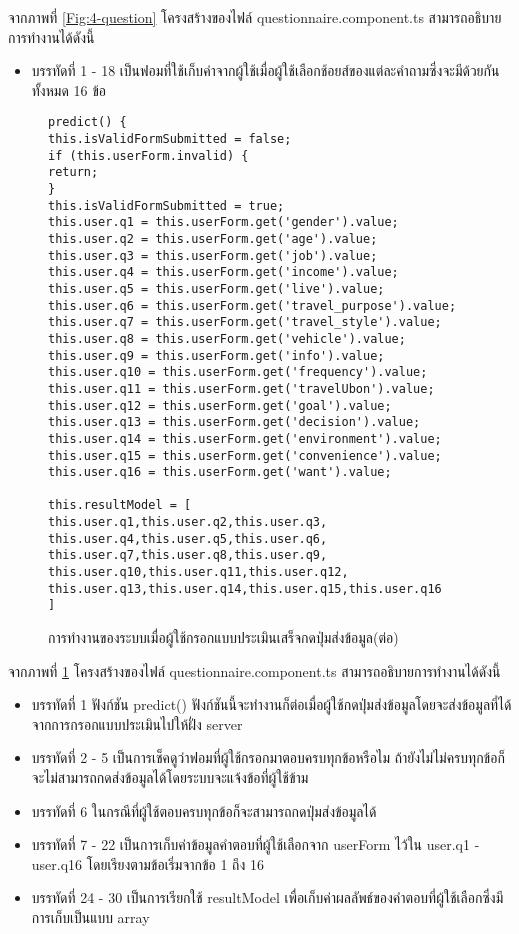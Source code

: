 จากภาพที่ \ref{Fig:4-question} โครงสร้างของไฟล์ questionnaire.component.ts สามารถอธิบายการทำงานได้ดังนี้
\begin{itemize}[label={--}]
\item บรรทัดที่ 1 - 18 เป็นฟอมที่ใช้เก็บค่าจากผู้ใช้เมื่อผู้ใช้เลือกช้อยส์ของแต่ละคำถามซึ่งจะมีด้วยกันทั้งหมด 16 ข้อ
\end{itemize}
\newpage

\begin{figure}[H]
{\begin{lstlisting}
predict() {
this.isValidFormSubmitted = false;
if (this.userForm.invalid) {
return;
}
this.isValidFormSubmitted = true;
this.user.q1 = this.userForm.get('gender').value;
this.user.q2 = this.userForm.get('age').value;
this.user.q3 = this.userForm.get('job').value;
this.user.q4 = this.userForm.get('income').value;
this.user.q5 = this.userForm.get('live').value;
this.user.q6 = this.userForm.get('travel_purpose').value;
this.user.q7 = this.userForm.get('travel_style').value;
this.user.q8 = this.userForm.get('vehicle').value;
this.user.q9 = this.userForm.get('info').value;
this.user.q10 = this.userForm.get('frequency').value;
this.user.q11 = this.userForm.get('travelUbon').value;
this.user.q12 = this.userForm.get('goal').value;
this.user.q13 = this.userForm.get('decision').value;
this.user.q14 = this.userForm.get('environment').value;
this.user.q15 = this.userForm.get('convenience').value;
this.user.q16 = this.userForm.get('want').value;

this.resultModel = [
this.user.q1,this.user.q2,this.user.q3,
this.user.q4,this.user.q5,this.user.q6,
this.user.q7,this.user.q8,this.user.q9,
this.user.q10,this.user.q11,this.user.q12,
this.user.q13,this.user.q14,this.user.q15,this.user.q16
]
\end{lstlisting}}
\caption{การทำงานของระบบเมื่อผู้ใช้กรอกแบบประเมินเสร็จกดปุ่มส่งข้อมูล(ต่อ)}
\label{Fig:4-question1}
\end{figure}
\newpage

จากภาพที่ \ref{Fig:4-question1} โครงสร้างของไฟล์ questionnaire.component.ts สามารถอธิบายการทำงานได้ดังนี้
\begin{itemize}[label={--}]
\item บรรทัดที่ 1 ฟังก์ชัน predict() ฟังก์ชันนี้จะทำงานก็ต่อเมื่อผู้ใช้กดปุ่มส่งข้อมูลโดยจะส่งข้อมูลที่ได้จากการกรอกแบบประเมินไปให้ฝั่ง server
\item บรรทัดที่ 2 - 5 เป็นการเช็คดูว่าฟอมที่ผู้ใช้กรอกมาตอบครบทุกข้อหรือไม ถ้ายังไม่ไม่ครบทุกข้อก็จะไม่สามารถกดส่งข้อมูลได้โดยระบบจะแจ้งข้อที่ผู้ใช้ข้าม
\item บรรทัดที่ 6 ในกรณีที่ผู้ใช้ตอบครบทุกข้อก็จะสามารถกดปุ่มส่งข้อมูลได้
\item บรรทัดที่ 7 - 22 เป็นการเก็บค่าข้อมูลคำตอบที่ผู้ใช้เลือกจาก userForm ไว้ใน user.q1 - user.q16 โดยเรียงตามข้อเริ่มจากข้อ 1 ถึง 16
\item บรรทัดที่ 24 - 30 เป็นการเรียกใช้ resultModel เพื่อเก็บค่าผลลัพธ์ของคำตอบที่ผู้ใช้เลือกซึ่งมีการเก็บเป็นแบบ array
\end{itemize}

